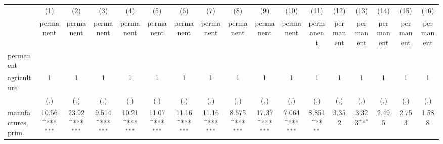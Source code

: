 {
\def\sym#1{\ifmmode^{#1}\else\(^{#1}\)\fi}
\begin{tabular}{l*{16}{c}}
\hline\hline
                    &\multicolumn{1}{c}{(1)}&\multicolumn{1}{c}{(2)}&\multicolumn{1}{c}{(3)}&\multicolumn{1}{c}{(4)}&\multicolumn{1}{c}{(5)}&\multicolumn{1}{c}{(6)}&\multicolumn{1}{c}{(7)}&\multicolumn{1}{c}{(8)}&\multicolumn{1}{c}{(9)}&\multicolumn{1}{c}{(10)}&\multicolumn{1}{c}{(11)}&\multicolumn{1}{c}{(12)}&\multicolumn{1}{c}{(13)}&\multicolumn{1}{c}{(14)}&\multicolumn{1}{c}{(15)}&\multicolumn{1}{c}{(16)}\\
                    &\multicolumn{1}{c}{permanent}&\multicolumn{1}{c}{permanent}&\multicolumn{1}{c}{permanent}&\multicolumn{1}{c}{permanent}&\multicolumn{1}{c}{permanent}&\multicolumn{1}{c}{permanent}&\multicolumn{1}{c}{permanent}&\multicolumn{1}{c}{permanent}&\multicolumn{1}{c}{permanent}&\multicolumn{1}{c}{permanent}&\multicolumn{1}{c}{permanent}&\multicolumn{1}{c}{permanent}&\multicolumn{1}{c}{permanent}&\multicolumn{1}{c}{permanent}&\multicolumn{1}{c}{permanent}&\multicolumn{1}{c}{permanent}\\
\hline
permanent           &                     &                     &                     &                     &                     &                     &                     &                     &                     &                     &                     &                     &                     &                     &                     &                     \\
agriculture         &           1         &           1         &           1         &           1         &           1         &           1         &           1         &           1         &           1         &           1         &           1         &           1         &           1         &           1         &           1         &           1         \\
                    &         (.)         &         (.)         &         (.)         &         (.)         &         (.)         &         (.)         &         (.)         &         (.)         &         (.)         &         (.)         &         (.)         &         (.)         &         (.)         &         (.)         &         (.)         &         (.)         \\
[1em]
manufactures, prim. &       10.56\sym{***}&       23.92\sym{***}&       9.514\sym{***}&       10.21\sym{***}&       11.07\sym{***}&       11.16\sym{***}&       11.16\sym{***}&       8.675\sym{***}&       17.37\sym{***}&       7.064\sym{***}&       8.851\sym{**} &       3.352         &       3.323\sym{*}  &       2.495         &       2.753         &       1.588         \\

\end{tabular}}
